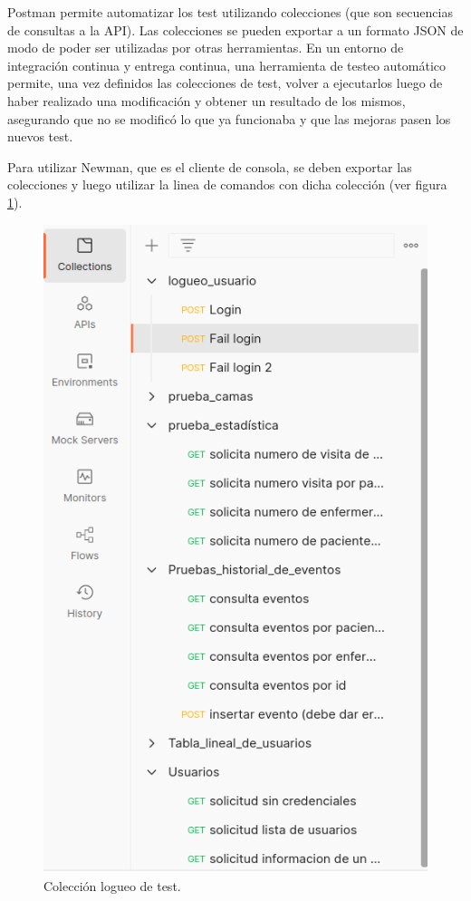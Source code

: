 Postman permite automatizar los test utilizando colecciones (que son secuencias de consultas a la API). Las colecciones se pueden exportar a un formato JSON de modo de poder ser utilizadas por otras herramientas. En un entorno de integración continua y entrega continua, una herramienta de testeo automático permite, una vez definidos las colecciones de test, volver a ejecutarlos luego de haber realizado una modificación y obtener un resultado de los mismos, asegurando que no se modificó lo que ya funcionaba y que las mejoras pasen los nuevos test. 

Para utilizar Newman, que es el cliente de consola, se deben exportar las colecciones y luego utilizar la linea de comandos con dicha colección (ver figura \ref{fig:Colección logueo usuario en Postman}). 


\begin{figure}[ht]
	\centering
	\includegraphics[scale=.45]{./Figures/Postman.png}
	\caption{Colección logueo de test.}
	\label{fig:Colección logueo usuario en Postman}
\end{figure}

